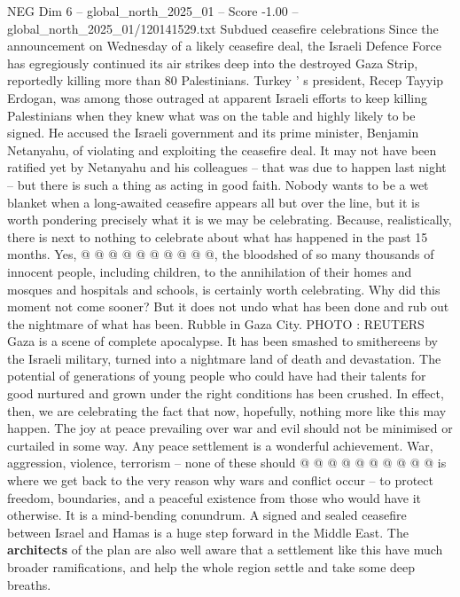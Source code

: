 \begin{textsample}{NEG Dim 6 – global\_north\_2025\_01 – Score -1.00 – global\_north\_2025\_01/120141529.txt}  \label{ex:f6_neg_097}
Subdued ceasefire celebrations Since the announcement on Wednesday of a likely ceasefire deal, the Israeli Defence Force has egregiously continued its air strikes deep into the destroyed Gaza Strip, reportedly killing more than 80 Palestinians.
Turkey ' s president, Recep Tayyip Erdogan, was among those outraged at apparent Israeli efforts to keep killing Palestinians when they knew what was on the table and highly likely to be signed.
He accused the Israeli government and its prime minister, Benjamin Netanyahu, of violating and exploiting the ceasefire deal.
It may not have been ratified yet by Netanyahu and his colleagues -- that was due to happen last night -- but there is such a thing as acting in good faith.
Nobody wants to be a wet blanket when a long-awaited ceasefire appears all but over the line, but it is worth pondering precisely what it is we may be celebrating.
Because, realistically, there is next to nothing to celebrate about what has happened in the past 15 months.
Yes, @ @ @ @ @ @ @ @ @ @, the bloodshed of so many thousands of innocent people, including children, to the annihilation of their homes and mosques and hospitals and schools, is certainly worth celebrating.
Why did this moment not come sooner?
But it does not undo what has been done and rub out the nightmare of what has been.
Rubble in Gaza City.
PHOTO : REUTERS Gaza is a scene of complete apocalypse.
It has been smashed to smithereens by the Israeli military, turned into a nightmare land of death and devastation.
The potential of generations of young people who could have had their talents for good nurtured and grown under the right conditions has been crushed.
In effect, then, we are celebrating the fact that now, hopefully, nothing more like this may happen.
The joy at peace prevailing over war and evil should not be minimised or curtailed in some way.
Any peace settlement is a wonderful achievement.
War, aggression, violence, terrorism -- none of these should @ @ @ @ @ @ @ @ @ @ is where we get back to the very reason why wars and conflict occur -- to protect freedom, boundaries, and a peaceful existence from those who would have it otherwise.
It is a mind-bending conundrum.
A signed and sealed ceasefire between Israel and Hamas is a huge step forward in the Middle East.
The \textbf{architects} of the plan are also well aware that a settlement like this have much broader ramifications, and help the whole region settle and take some deep breaths.

\end{textsample}
